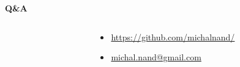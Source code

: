\documentclass[xcolor=dvipsnames]{beamer}
\begin{document}
\begin{frame}{\bf Q\&A}


\begin{columns}

    \begin{column}{0.5\textwidth}
    \end{column}

    \begin{column}{0.5\textwidth}
      \begin{itemize}
        \item \url{https://github.com/michalnand/}
        \item \url{michal.nand@gmail.com}
      \end{itemize}
    \end{column}


\end{columns}

\end{frame}
\end{document}
